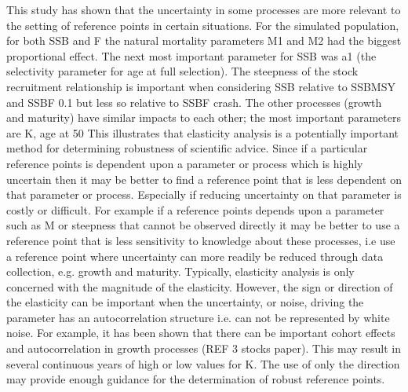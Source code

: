 \documentclass{pnastwo}
\begin{document}
\begin{article}
This study has shown that the uncertainty in some processes are more relevant to the setting of reference points in certain situations. For the simulated population, for both SSB and F the natural mortality parameters M1 and M2 had the biggest proportional eﬀect. The next most important parameter for SSB was a1 (the selectivity parameter for age at full selection). The steepness of the stock recruitment relationship is important when considering SSB relative to SSBMSY and SSBF 0.1 but less so relative to SSBF crash. The other processes (growth and maturity) have similar impacts to each other; the most important parameters are K, age at 50%
This illustrates that elasticity analysis is a potentially important method for determining robustness of scientific advice. Since if a particular reference points is dependent upon a parameter or process which is highly uncertain then it may be better to ﬁnd a reference point that is less dependent on that parameter or process. Especially if reducing uncertainty on that parameter is costly or diﬃcult. For example if a reference points depends upon a parameter such as M or steepness that cannot be observed directly it may be better to use a reference point that is less sensitivity to knowledge about these processes, i.e use a reference point where uncertainty can more readily be reduced through data collection, e.g. growth and maturity. 
Typically, elasticity analysis is only concerned with the magnitude of the elasticity. However, the sign or direction of the elasticity can be important when the uncertainty, or noise, driving the parameter has an autocorrelation structure i.e. can not be represented by white noise. For example, it has been shown that there can be important cohort eﬀects and autocorrelation in growth processes (REF 3 stocks paper). This may result in several continuous years of high or low values for K. The use of only the direction may provide enough guidance for the determination of robust reference points.

\end{article}
\end{document}

